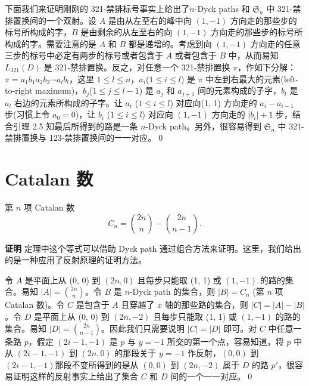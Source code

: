 下面我们来证明刚刚的 321-禁排标号事实上给出了$n$-Dyck paths 和
$\mathfrak{S}_n$ 中 321-禁排置换间的一个双射。设 $A$
是由从左至右的峰中向 $(1, -1)$ 方向走的那些步的标号所构成的字，$B$
是由剩余的从左至右的向 $(1, -1)$
方向走的那些步的标号所构成的字。需要注意的是 $A$ 和 $B$
都是递增的。考虑到向 $(1, -1)$
方向走的任意三步的标号中必定有两步的标号或者包含于 $A$ 或者包含于
$B$ 中，从而易知 $L_{321}(D)$ 是 321-禁排置换。反之，对任意一个
321-禁排置换 $\pi$，作如下分解：$\pi=a_1b_1a_2b_2\cdots
a_lb_l$，这里 $1\le l\le n$，$a_i$($1\le i\le l$) 是 $\pi$
中左到右最大的元素(left-to-right maximum)，$b_j$($1\le j\le l-1$) 是
$a_j$ 和 $a_{j+1}$ 间的元素构成的子字，$b_l$ 是 $a_l$
右边的元素所构成的子字。让 $a_i$ ($1\le i\le l$) 对应向(1, 1)
方向走的 $a_i-a_{i-1}$ 步(习惯上令 $a_0=0$)，让 $b_i$ ($1\le i\le
l$) 对应向 $(1, -1)$ 方向走的 $|b_i|+1$ 步，结合引理 2.5
知最后所得到的路是一条 $n$-Dyck path。另外，很容易得到
$\mathfrak{S}_n$ 中 321-禁排置换与 123-禁排置换间的一一对应。\qed

\section{Catalan 数}

\begin{thm}第 $n$ 项 Catalan 数
$$C_n={2n\choose n}-{2n\choose n-1}.$$
\end{thm}
{\bf{证明}} 定理中这个等式可以借助 Dyck path
通过组合方法来证明。这里，我们给出的是一种应用了反射原理的证明方法。

令 $A$ 是平面上从 (0, 0) 到 $(2n, 0)$ 且每步只能取 (1, 1) 或 $(1,
-1)$ 的路的集合。易知 $|A|={2n\choose n}$。令 $B$ 是 $n$-Dyck path
的集合，则 $|B|=C_n$ (第 $n$ 项 Catalan 数)。令 $C$ 是包含于 $A$
且穿越了 $x$ 轴的那些路的集合，则 $|C|=|A|-|B|$。令 $D$ 是平面上从
(0, 0) 到 $(2n, -2)$ 且每步只能取 (1, 1) 或 $(1, -1)$
的路的集合。易知 $|D|={2n\choose n-1}$。因此我们只需要说明 $|C|=|D|$
即可。对 $C$ 中任意一条路 $p$，假定 $(2i-1, -1)$ 是 $p$ 与 $y=-1$
所交的第一个点，容易知道，将 $p$ 中从 $(2i-1, -1)$ 到 $(2n, 0)$
的那段关于 $y=-1$ 作反射，$(0, 0)$ 到 $(2i-1,
-1)$那段不变所得到的是从 $(0, 0)$ 到 $(2n, -2)$ 属于 $D$ 的路
$p'$，很容易证明这样的反射事实上给出了集合 $C$ 和 $D$
间的一个一一对应。\qed

